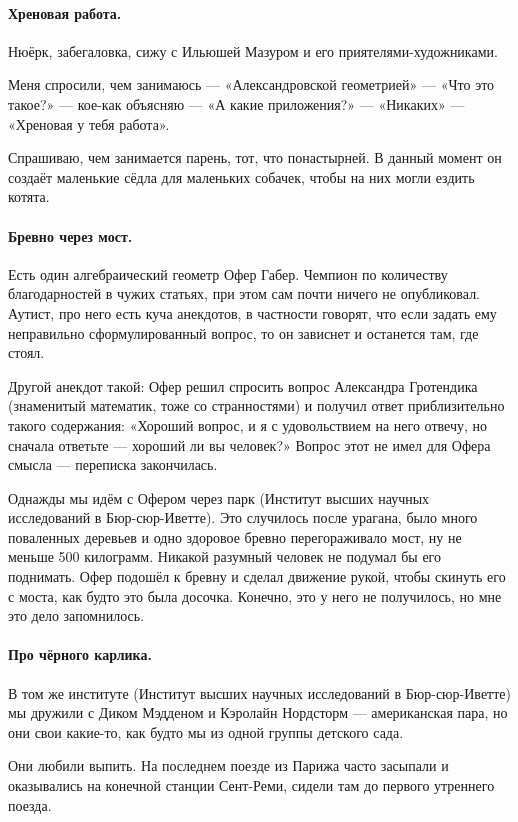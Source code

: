 \documentclass{book}
\begin{document}
\paragraph{Хреновая работа.}
Нюёрк, забегаловка, сижу с Ильюшей Мазуром и его приятелями-художниками.

Меня спросили, чем занимаюсь --- «Александровской геометрией» --- «Что это такое?» --- кое-как объясняю --- «А какие приложения?» --- «Никаких» --- «Хреновая у тебя работа».

Спрашиваю, чем занимается парень, тот, что понастырней.
В данный момент он создаёт маленькие сёдла для маленьких собачек, чтобы на них могли ездить котята.

\paragraph{Бревно через мост.}
Есть один алгебраический геометр Офер Габер.
Чемпион по количеству благодарностей в чужих статьях, при этом сам почти ничего не опубликовал.
Аутист, про него есть куча анекдотов, в частности говорят, что если задать ему неправильно сформулированный вопрос, то он зависнет и останется там, где стоял.

Другой анекдот такой: Офер решил спросить вопрос Александра Гротендика (знаменитый математик, тоже со странностями) и получил ответ приблизительно такого содержания: «Хороший вопрос, и я с удовольствием на него отвечу, но сначала ответьте --- хороший ли вы человек?»
Вопрос этот не имел для Офера смысла --- переписка закончилась.

Однажды мы идём с Офером через парк (Институт высших научных исследований в Бюр-сюр-Иветте).
Это случилось после урагана, было много поваленных деревьев и одно здоровое бревно перегораживало мост,
ну не меньше 500 килограмм.
Никакой разумный человек не подумал бы его поднимать.
Офер подошёл к бревну и сделал движение рукой, чтобы скинуть его с моста, как будто это была досочка.
Конечно, это у него не получилось, но мне это дело запомнилось.

\paragraph{Про чёрного карлика.}
В том же институте (Институт высших научных исследований в Бюр-сюр-Иветте) мы дружили с  
Диком Мэдденом и Кэролайн Нордсторм --- американская пара, но они свои какие-то, как будто мы из одной группы детского сада.

Они любили выпить.
На последнем поезде из Парижа часто засыпали и оказывались на конечной станции Сент-Реми, сидели там до первого утреннего поезда.
\end{document}
